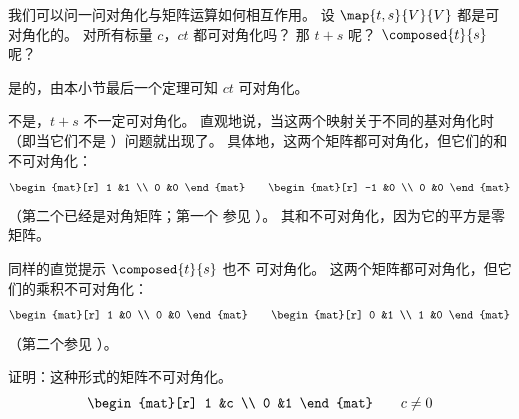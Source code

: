     我们可以问一问对角化与矩阵运算如何相互作用。
    设 \( \map{t,s}{V}{V} \) 都是可对角化的。
    对所有标量 \( c \)，\( ct \) 都可对角化吗？
    那 \( t+s \) 呢？
    \( \composed{t}{s} \) 呢？
    \begin{answer}
      是的，由本小节最后一个定理可知 \( ct \) 可对角化。

      不是，\( t+s \) 不一定可对角化。
      直观地说，当这两个映射关于不同的基对角化时
      （即当它们不是
      ）问题就出现了。
      具体地，这两个矩阵都可对角化，但它们的和不可对角化：
      \begin{equation*}
         \begin{mat}[r]
            1  &1  \\
            0  &0
         \end{mat}
         \qquad
         \begin{mat}[r]
           -1  &0  \\
            0  &0
         \end{mat}
      \end{equation*}
      （第二个已经是对角矩阵；第一个
      参见 ）。
      其和不可对角化，因为它的平方是零矩阵。 

     同样的直觉提示 \( \composed{t}{s} \) 也不
     可对角化。
     这两个矩阵都可对角化，但它们的乘积不可对角化：
     \begin{equation*}
        \begin{mat}[r]
           1  &0  \\
           0  &0
        \end{mat}
        \qquad
        \begin{mat}[r]
           0  &1  \\
           1  &0
        \end{mat}
     \end{equation*}
     （第二个参见 ）。   
    \end{answer}
  \item 
    证明：这种形式的矩阵不可对角化。
    \begin{equation*}
       \begin{mat}[r]
          1  &c  \\
          0  &1
       \end{mat}
       \qquad c\neq 0
    \end{equation*}
